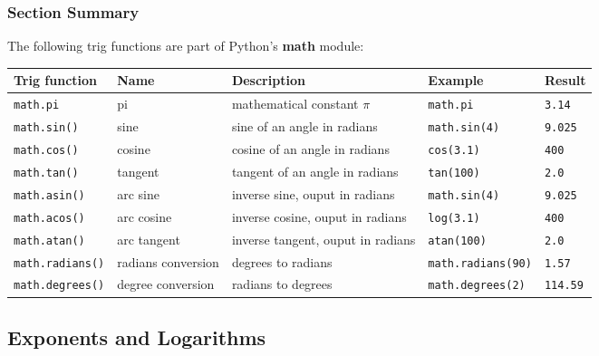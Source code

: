 \documentclass{book}
\newcommand{\passthrough}[1]{#1}
\begin{document}
    
        \hypertarget{section-summary}{%
\subsubsection{Section Summary}\label{section-summary}}

The following trig functions are part of Python's \textbf{math} module:

\begin{longtable}[]{@{}lllll@{}}
\toprule
Trig function & Name & Description & Example & Result\tabularnewline
\midrule
\endhead
\passthrough{\lstinline!math.pi!} & pi & mathematical constant \(\pi\) &
\passthrough{\lstinline!math.pi!} &
\passthrough{\lstinline!3.14!}\tabularnewline
\passthrough{\lstinline!math.sin()!} & sine & sine of an angle in
radians & \passthrough{\lstinline!math.sin(4)!} &
\passthrough{\lstinline!9.025!}\tabularnewline
\passthrough{\lstinline!math.cos()!} & cosine & cosine of an angle in
radians & \passthrough{\lstinline!cos(3.1)!} &
\passthrough{\lstinline!400!}\tabularnewline
\passthrough{\lstinline!math.tan()!} & tangent & tangent of an angle in
radians & \passthrough{\lstinline!tan(100)!} &
\passthrough{\lstinline!2.0!}\tabularnewline
\passthrough{\lstinline!math.asin()!} & arc sine & inverse sine, ouput
in radians & \passthrough{\lstinline!math.sin(4)!} &
\passthrough{\lstinline!9.025!}\tabularnewline
\passthrough{\lstinline!math.acos()!} & arc cosine & inverse cosine,
ouput in radians & \passthrough{\lstinline!log(3.1)!} &
\passthrough{\lstinline!400!}\tabularnewline
\passthrough{\lstinline!math.atan()!} & arc tangent & inverse tangent,
ouput in radians & \passthrough{\lstinline!atan(100)!} &
\passthrough{\lstinline!2.0!}\tabularnewline
\passthrough{\lstinline!math.radians()!} & radians conversion & degrees
to radians & \passthrough{\lstinline!math.radians(90)!} &
\passthrough{\lstinline!1.57!}\tabularnewline
\passthrough{\lstinline!math.degrees()!} & degree conversion & radians
to degrees & \passthrough{\lstinline!math.degrees(2)!} &
\passthrough{\lstinline!114.59!}\tabularnewline
\bottomrule
\end{longtable}
    




    
        \hypertarget{exponents-and-logarithms}{%
\subsection{Exponents and Logarithms}\label{exponents-and-logarithms}}
    
\end{document}
